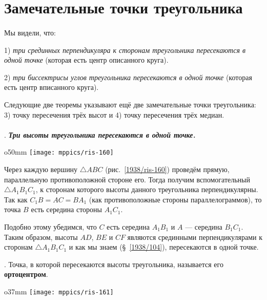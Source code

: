 \section{Замечательные точки треугольника}

\paragraph{}\label{1938/141}
Мы видели, что:

1) \emph{три срединных перпендикуляра к сторонам треугольника пересекаются в одной точке} (которая есть центр описанного круга). 

2) \emph{три биссектрисы углов треугольника пересекаются в одной точке} (которая есть центр вписанного круга).

Следующие две теоремы указывают ещё две замечательные точки треугольника:
3) точку пересечения трёх высот и 4) точку пересечения трёх медиан.

\paragraph{}\label{1938/142}
.
\textbf{\emph{Три высоты треугольника пересекаются в одной точке.}}

\begin{wrapfigure}{o}{50mm}
\centering
\texttt{[image: mppics/ris-160]}
\caption{}\label{1938/ris-160}
\end{wrapfigure}

Через каждую вершину $\triangle ABC$ (рис.~\ref{1938/ris-160}) проведём прямую, параллельную противоположной стороне его.
Тогда получим вспомогательный $\triangle A_1B_1C_1$, к сторонам которого высоты данного треугольника перпендикулярны.
Так как $C_1B=AC=BA_1$ (как противоположные стороны параллелограммов), то точка $B$ есть середина стороны $A_1C_1$.

Подобно этому убедимся, что $C$ есть середина $A_1B_1$ и $A$ — середина $B_1C_1$.
Таким образом, высоты $AD$, $BE$ и $CF$ являются
срединными перпендикулярами к сторонам $\triangle A_1B_1C_1$ и как мы знаем (§~\ref{1938/104}), пересекаются в одной точке.

\smallskip
\mbox{.}
Точка, в которой пересекаются высоты треугольника, называется его \textbf{ортоцентром}.

\begin{wrapfigure}{o}{37mm}
\vskip-0mm
\centering
\texttt{[image: mppics/ris-161]}
\caption{}\label{1938/ris-161}
\end{wrapfigure}

